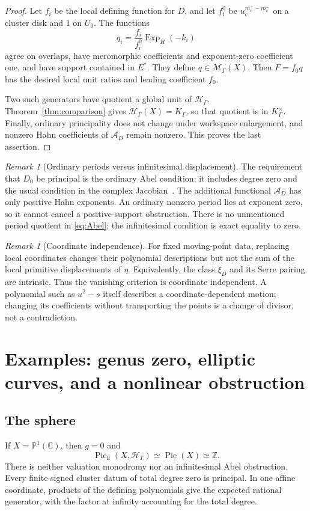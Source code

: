 \documentclass[11pt,letterpaper]{article}
\numberwithin{equation}{section}
\theoremstyle{definition}
\theoremstyle{remark}
\newtheorem{remark}[theorem]{Remark}
\newcommand{\C}{\mathbb C}
\newcommand{\Z}{\mathbb Z}
\newcommand{\HH}{\mathcal H}
\newcommand{\MM}{\mathscr M}
\newcommand{\Pic}{\operatorname{Pic}}
\newcommand{\Piclf}{\operatorname{Pic}_{\mathrm{lf}}}
\newcommand{\Exp}{\operatorname{Exp}_{H}}
\newcommand{\Hg}{\HH_\Gamma}
\newcommand{\Mg}{\MM_\Gamma}
\newcommand{\Kg}{K_\Gamma}
\begin{document}
\begin{proof}
Let $f_i$ be the local defining function for $D$, and let $f_i^0$ be
$u_c^{m_c^+-m_c^-}$ on a cluster disk and $1$ on $U_0$.
The functions
\[
 q_i=\frac{f_i}{f_i^0}\Exp(-k_i)
\]
agree on overlaps, have meromorphic coefficients and exponent-zero
coefficient one, and have support contained in $E^*$. They define
$q\in\Mg(X)$. Then $F=f_0q$ has the desired local unit ratios and
leading coefficient $f_0$.

Two such generators have quotient a global unit of $\Hg$.
Theorem~\ref{thm:comparison} gives $\Hg(X)=\Kg$, so that quotient is
in $\Kg^\times$. Finally, ordinary principality does not change under
workspace enlargement, and nonzero Hahn coefficients of
$\mathcal A_D$ remain nonzero. This proves the last assertion.
\end{proof}

\begin{remark}[Ordinary periods versus infinitesimal displacement]
The requirement that $D_0$ be principal is the ordinary Abel condition:
it includes degree zero and the usual condition in the complex
Jacobian~\cite{narasimhan}. The additional functional
$\mathcal A_D$ has only positive Hahn exponents. An ordinary nonzero
period lies at exponent zero, so it cannot cancel a positive-support
obstruction. There is no unmentioned period quotient in
\eqref{eq:Abel}; the infinitesimal condition is exact equality to zero.
\end{remark}

\begin{remark}[Coordinate independence]
For fixed moving-point data, replacing local coordinates changes their
polynomial descriptions but not the sum of the local primitive
displacements of $\eta$. Equivalently, the class $\xi_D$ and its Serre
pairing are intrinsic. Thus the vanishing criterion is coordinate
independent. A polynomial such as $u^2-s$ itself describes a
coordinate-dependent motion; changing its coefficients without
transporting the points is a change of divisor, not a contradiction.
\end{remark}

\section{Examples: genus zero, elliptic curves, and a nonlinear obstruction}
\label{sec:examples}

\subsection{The sphere}
If $X=\mathbb P^1(\C)$, then $g=0$ and
\[
 \Piclf(X,\Hg)\simeq\Pic(X)\simeq\Z.
\]
There is neither valuation monodromy nor an infinitesimal Abel
obstruction. Every finite signed cluster datum of total degree zero is
principal. In one affine coordinate, products of the defining
polynomials give the expected rational generator, with the factor at
infinity accounting for the total degree.
\end{document}
